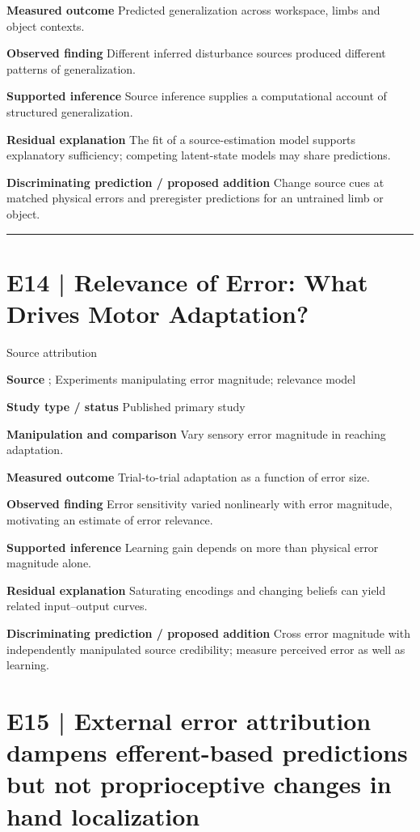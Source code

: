 \documentclass[11pt,a4paper]{article}
\begin{document}
\textbf{Measured outcome} Predicted generalization across workspace, limbs and object contexts.\par
\textbf{Observed finding} Different inferred disturbance sources produced different patterns of generalization.\par
\textbf{Supported inference} Source inference supplies a computational account of structured generalization.\par
\textbf{Residual explanation} The fit of a source-estimation model supports explanatory sufficiency; competing latent-state models may share predictions.\par
\textbf{Discriminating prediction / proposed addition} Change source cues at matched physical errors and preregister predictions for an untrained limb or object.\par
\bigskip\hrule\medskip\section{E14 | Relevance of Error: What Drives Motor Adaptation?}
{\small\sffamily\color{navy} Source attribution}\par
\textbf{Source} \cite{wei2009}; Experiments manipulating error magnitude; relevance model\par
\textbf{Study type / status} Published primary study\par
\textbf{Manipulation and comparison} Vary sensory error magnitude in reaching adaptation.\par
\textbf{Measured outcome} Trial-to-trial adaptation as a function of error size.\par
\textbf{Observed finding} Error sensitivity varied nonlinearly with error magnitude, motivating an estimate of error relevance.\par
\textbf{Supported inference} Learning gain depends on more than physical error magnitude alone.\par
\textbf{Residual explanation} Saturating encodings and changing beliefs can yield related input--output curves.\par
\textbf{Discriminating prediction / proposed addition} Cross error magnitude with independently manipulated source credibility; measure perceived error as well as learning.\par
\clearpage\section{E15 | External error attribution dampens efferent-based predictions but not proprioceptive changes in hand localization}
\end{document}
